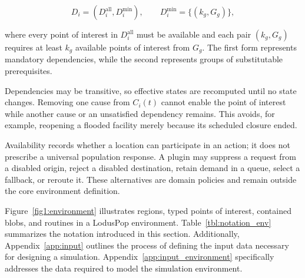\begin{equation}
D_i=\left(D_i^{\mathrm{all}},D_i^{\mathrm{min}}\right),
\qquad D_i^{\mathrm{min}}=\{(k_g,G_g)\},
\label{eq:poi_dependencies}
\end{equation}

where every point of interest in $D_i^{\mathrm{all}}$ must be available and each pair $(k_g,G_g)$ requires at least $k_g$ available points of interest from $G_g$. The first form represents mandatory dependencies, while the second
represents groups of substitutable prerequisites. 

Dependencies may be transitive, so effective states are recomputed until no state changes. Removing one cause from $C_i(t)$ cannot enable the point of interest while another cause or an unsatisfied dependency remains. This avoids, for example, reopening a flooded facility merely because its scheduled closure ended.

Availability records whether a location can participate in an action; it does not prescribe a universal population response. A plugin may suppress a request from a disabled origin, reject a disabled destination, retain demand in a queue, select a fallback, or reroute it. These alternatives are domain policies and remain outside the core environment definition.

\endgroup

Figure~\ref{fig1:environment} illustrates
regions, typed points of interest, contained blobs, and routines in a LodusPop
environment.
Table~\ref{tbl:notation_env} summarizes the notation introduced in this section.
Additionally, Appendix~\ref{app:input} outlines the process of defining the input data necessary for designing a simulation. Appendix~\ref{app:input_environment} specifically addresses the data required to model the simulation environment. 

